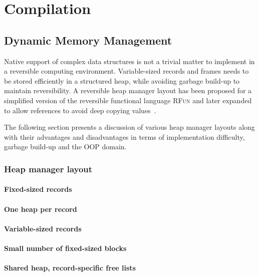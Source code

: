 \chapter{Compilation}

\section{Dynamic Memory Management}
Native support of complex data structures is not a trivial matter to implement in a reversible computing environment. Variable-sized records and frames needs to be stored efficiently in a structured heap, while avoiding garbage build-up to maintain reversibility. A reversible heap manager layout has been proposed for a simplified version of the reversible functional language \textsc{RFun} and later expanded to allow references to avoid deep copying values~\cite{ha:heap, ty:rfun, tm:refcounting}.

The following section presents a discussion of various heap manager layouts along with their advantages and disadvantages in terms of implementation difficulty, garbage build-up and the OOP domain. 

\subsection{Heap manager layout}

\subsubsection{Fixed-sized records}

\subsubsection{One heap per record}

\subsubsection{Variable-sized records}

\subsubsection{Small number of fixed-sized blocks}

\subsubsection{Shared heap, record-specific free lists}






